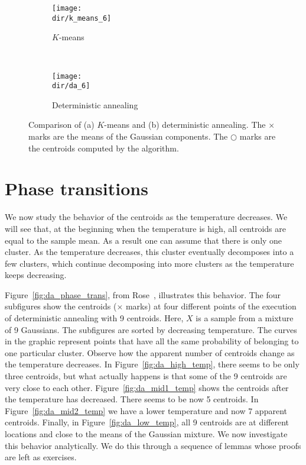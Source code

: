 \begin{figure}
    \centering
    \begin{subfigure}[b]{0.4\textwidth}
        \texttt{[image: \\dir/k\_means\_6]}
        \caption{$K$-means}
        \label{fig:k_means_6}
    \end{subfigure}
    ~ %
    \begin{subfigure}[b]{0.4\textwidth}
        \texttt{[image: \\dir/da\_6]}
        \caption{Deterministic annealing}
        \label{fig:da_6}
    \end{subfigure}
    \caption{Comparison of (a) $K$-means and (b) deterministic annealing. The $\times$ marks are the means of the Gaussian components. The $\bigcirc$ marks are the centroids computed by the algorithm.}\label{fig:da_vs_k_means}
\end{figure}

\section{Phase transitions}
\label{sec:phase_trans}

We now study the behavior of the centroids as the temperature decreases.
We will see that, at the beginning when the temperature is high, all centroids
are equal to the sample mean. As a result one can assume that there
is only one cluster. As the temperature decreases, this cluster eventually decomposes into a few clusters, which continue decomposing into more clusters as the temperature keeps decreasing.

Figure~\ref{fig:da_phase_trans}, from Rose~\cite{rose1998deterministic}, illustrates this behavior. The four subfigures show the centroids ($\times$ marks) at four different points of the execution of
deterministic annealing with 9 centroids. Here, $X$ is a sample from a mixture of 9 Gaussians.
The subfigures are sorted by decreasing temperature. The curves in the graphic represent points that have all the same probability of belonging to one particular cluster. Observe how the apparent number of centroids change as the temperature
decreases. In Figure~\ref{fig:da_high_temp}, there seems to be only three centroids,
but what actually happens is that some of the 9 centroids are very close to
each other. Figure~\ref{fig:da_mid1_temp} shows the centroids after the temperature has decreased.
There seems to be now 5 centroids. In Figure~\ref{fig:da_mid2_temp} we have a lower
temperature and now 7 apparent centroids. Finally, in Figure~\ref{fig:da_low_temp}, all 9
centroids are at different locations and close to the means of the Gaussian
mixture.
We now investigate this behavior analytically. We do this through a
sequence of lemmas whose proofs are left as exercises.

